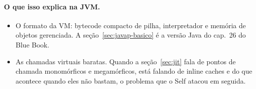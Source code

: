 \paragraph{O que isso explica na JVM.}
\begin{itemize}
\item O formato da VM: bytecode compacto de pilha, interpretador e
  memória de objetos gerenciada. A seção~\ref{sec:javap-basico} é a
  versão Java do cap.~26 do Blue Book.
\item As chamadas virtuais baratas. Quando a seção~\ref{sec:jit} fala de
  pontos de chamada monomórficos e megamórficos, está falando de inline
  caches e do que acontece quando eles não bastam, o problema que o Self
  atacou em seguida.
\end{itemize}

